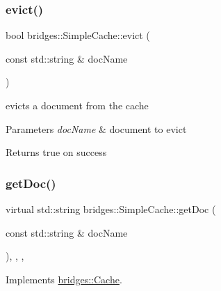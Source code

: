 \subsubsection{\texorpdfstring{evict()}{evict()}}
{\footnotesize\ttfamily bool bridges\+::\+Simple\+Cache\+::evict (\begin{DoxyParamCaption}\item[{const std\+::string \&}]{doc\+Name }\end{DoxyParamCaption})\hspace{0.3cm}{\ttfamily [inline]}}



evicts a document from the cache 


\begin{DoxyParams}{Parameters}
{\em doc\+Name} & document to evict \\
\hline
\end{DoxyParams}
\begin{DoxyReturn}{Returns}
true on success 
\end{DoxyReturn}
\mbox{\label{classbridges_1_1_simple_cache_a905ad2e7fb1b6784a5f70caf024b157f}} 
\subsubsection{\texorpdfstring{get\+Doc()}{getDoc()}}
{\footnotesize\ttfamily virtual std\+::string bridges\+::\+Simple\+Cache\+::get\+Doc (\begin{DoxyParamCaption}\item[{const std\+::string \&}]{doc\+Name }\end{DoxyParamCaption})\hspace{0.3cm}{\ttfamily [inline]}, {\ttfamily [override]}, {\ttfamily [virtual]}, {\ttfamily [noexcept]}}



Implements \hyperlink{classbridges_1_1_cache_abc1eaca36899e6e85df1c9a690f1d4dd}{bridges\+::\+Cache}.

\mbox{\label{classbridges_1_1_simple_cache_a9af328045bad7c3bd4ed6cf99352bf07}} 
